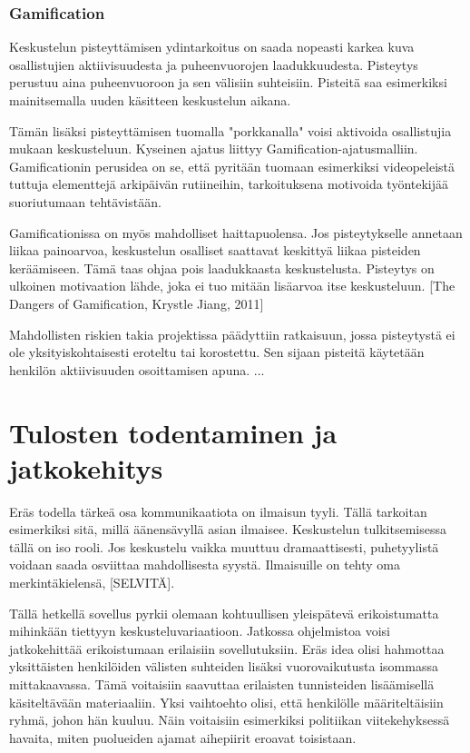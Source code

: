 \documentclass[11pt,a4paper,oneside]{memoir}
\begin{document}
\subsection{Gamification}
Keskustelun pisteyttämisen ydintarkoitus on saada nopeasti karkea kuva osallistujien aktiivisuudesta ja puheenvuorojen laadukkuudesta. Pisteytys perustuu aina puheenvuoroon ja sen välisiin suhteisiin. Pisteitä saa esimerkiksi mainitsemalla uuden käsitteen keskustelun aikana.

Tämän lisäksi pisteyttämisen tuomalla "porkkanalla" voisi aktivoida osallistujia mukaan keskusteluun. Kyseinen ajatus liittyy Gamification-ajatusmalliin. Gamificationin perusidea on se, että pyritään tuomaan esimerkiksi videopeleistä tuttuja elementtejä arkipäivän rutiineihin, tarkoituksena motivoida työntekijää suoriutumaan tehtävistään.

Gamificationissa on myös mahdolliset haittapuolensa. Jos pisteytykselle annetaan liikaa painoarvoa, keskustelun osalliset saattavat keskittyä liikaa pisteiden keräämiseen. Tämä taas ohjaa pois laadukkaasta keskustelusta. Pisteytys on ulkoinen motivaation lähde, joka ei tuo mitään lisäarvoa itse keskusteluun. [The Dangers of Gamification, Krystle Jiang, 2011]

Mahdollisten riskien takia projektissa päädyttiin ratkaisuun, jossa pisteytystä ei ole yksityiskohtaisesti eroteltu tai korostettu. Sen sijaan pisteitä käytetään henkilön aktiivisuuden osoittamisen apuna.
...

\chapter{Tulosten todentaminen ja jatkokehitys}
Eräs todella tärkeä osa kommunikaatiota on ilmaisun tyyli. Tällä tarkoitan esimerkiksi sitä, millä äänensävyllä asian ilmaisee. Keskustelun tulkitsemisessa tällä on iso rooli. Jos keskustelu vaikka muuttuu dramaattisesti, puhetyylistä voidaan saada osviittaa mahdollisesta syystä. Ilmaisuille on tehty oma merkintäkielensä, [SELVITÄ].

Tällä hetkellä sovellus pyrkii olemaan kohtuullisen yleispätevä erikoistumatta mihinkään tiettyyn keskusteluvariaatioon. Jatkossa ohjelmistoa voisi jatkokehittää erikoistumaan erilaisiin sovellutuksiin. Eräs idea olisi hahmottaa yksittäisten henkilöiden välisten suhteiden lisäksi vuorovaikutusta isommassa mittakaavassa. Tämä voitaisiin saavuttaa erilaisten tunnisteiden lisäämisellä käsiteltävään materiaaliin. Yksi vaihtoehto olisi, että henkilölle määriteltäisiin ryhmä, johon hän kuuluu. Näin voitaisiin esimerkiksi politiikan viitekehyksessä havaita, miten puolueiden ajamat aihepiirit eroavat toisistaan.
\end{document}
